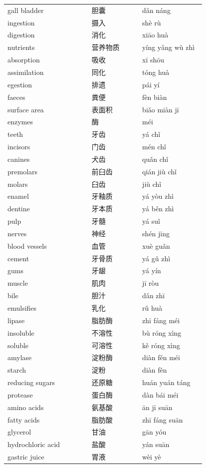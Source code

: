 \documentclass[11pt]{article}
\begin{document}
\begin{longtable}{@{}p{0.40\linewidth}p{0.24\linewidth}p{0.30\linewidth}@{}}
gall bladder & 胆囊 & dǎn náng \\
ingestion & 摄入 & shè rù \\
digestion & 消化 & xiāo huà \\
nutrients & 营养物质 & yíng yǎng wù zhì \\
absorption & 吸收 & xī shōu \\
assimilation & 同化 & tóng huà \\
egestion & 排遗 & pái yí \\
faeces & 粪便 & fèn biàn \\
surface area & 表面积 & biǎo miàn jī \\
enzymes & 酶 & méi \\
teeth & 牙齿 & yá chǐ \\
incisors & 门齿 & mén chǐ \\
canines & 犬齿 & quǎn chǐ \\
premolars & 前臼齿 & qián jiù chǐ \\
molars & 臼齿 & jiù chǐ \\
enamel & 牙釉质 & yá yòu zhì \\
dentine & 牙本质 & yá běn zhì \\
pulp & 牙髓 & yá suǐ \\
nerves & 神经 & shén jīng \\
blood vessels & 血管 & xuè guǎn \\
cement & 牙骨质 & yá gǔ zhì \\
gums & 牙龈 & yá yín \\
muscle & 肌肉 & jī ròu \\
bile & 胆汁 & dǎn zhī \\
emulsifies & 乳化 & rǔ huà \\
lipase & 脂肪酶 & zhī fáng méi \\
insoluble & 不溶性 & bù róng xìng \\
soluble & 可溶性 & kě róng xìng \\
amylase & 淀粉酶 & diàn fěn méi \\
starch & 淀粉 & diàn fěn \\
reducing sugars & 还原糖 & huán yuán táng \\
protease & 蛋白酶 & dàn bái méi \\
amino acids & 氨基酸 & ān jī suān \\
fatty acids & 脂肪酸 & zhī fáng suān \\
glycerol & 甘油 & gān yóu \\
hydrochloric acid & 盐酸 & yán suān \\
gastric juice & 胃液 & wèi yè \\

\end{longtable}
\end{document}
